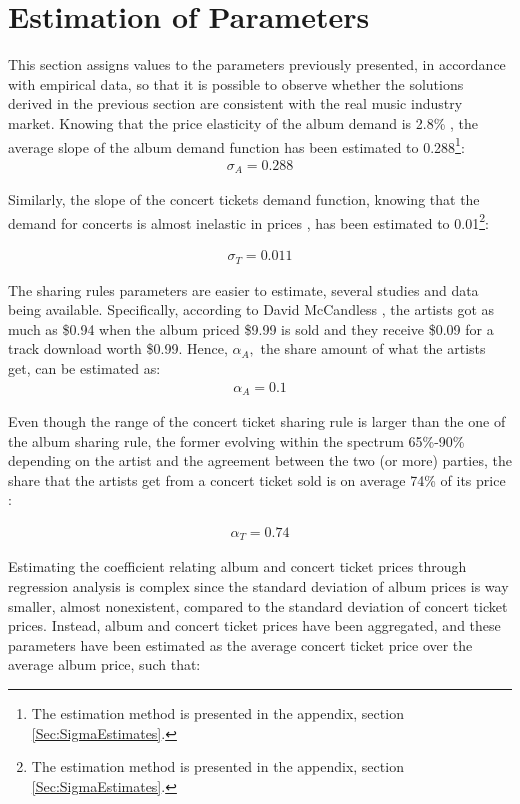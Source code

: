 \documentclass[a4paper,12pt]{article}
\numberwithin{equation}{section}
\begin{document}
\pagebreak

\section{Estimation of Parameters} \label{Sec:Estimates}

This section assigns values to the parameters previously presented,
in accordance with empirical data, so that it is possible to observe
whether the solutions derived in the previous section are consistent
with the real music industry market. Knowing that the price elasticity
of the album demand is 2.8\% \cite{gast2002}, the average slope of
the album demand function has been estimated to 0.288\footnote{
The estimation method is presented in the appendix, section \ref{Sec:SigmaEstimates}.
}:
\begin{eqnarray*}
\sigma_{A}=0.288
\end{eqnarray*}

Similarly, the slope of the concert tickets demand function, knowing
that the demand for concerts is almost inelastic in prices \cite{courty2009}, has been estimated to 0.01\footnote{
The estimation method is presented in the appendix, section \ref{Sec:SigmaEstimates}.
}:

\begin{eqnarray*}
\sigma_{T}=0.011
\end{eqnarray*}

The sharing rules parameters are easier to estimate, several studies
and data being available. Specifically, according to David McCandless \cite{mccandless2010}, the artists got as much as \$0.94 when the
album priced \$9.99 is sold and they receive \$0.09 for a track download
worth \$0.99. Hence, $\alpha_{A},$ the share amount of what the artists
get, can be estimated as:
\begin{eqnarray*}
\alpha_{A}=0.1
\end{eqnarray*}

Even though the range of the concert ticket sharing rule is larger
than the one of the album sharing rule, the former evolving within
the spectrum 65\%-90\% depending on the artist and the agreement between
the two (or more) parties, the share that the artists get from a concert
ticket sold is on average 74\% of its price \cite{michael2011}:

\begin{eqnarray*}
\alpha_{T} = 0.74
\end{eqnarray*}

Estimating the coefficient relating album and concert ticket prices
through regression analysis is complex since the standard deviation
of album prices is way smaller, almost nonexistent, compared to the
standard deviation of concert ticket prices. Instead, album and concert
ticket prices have been aggregated, and these parameters have been estimated
as the average concert ticket price over the average album price,
such that:
\end{document}
